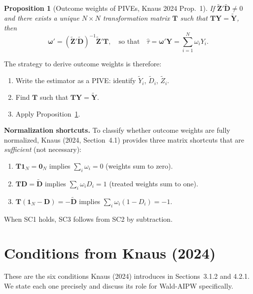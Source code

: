 \documentclass[12pt, a4paper]{article}
\theoremstyle{condstyle}
\theoremstyle{plain}
\newtheorem{proposition}{Proposition}
\newcommand{\bone}{\mathbf{1}_N}
\newcommand{\bzero}{\mathbf{0}_N}
\newcommand{\bD}{\mathbf{D}}
\newcommand{\bY}{\mathbf{Y}}
\begin{document}
\begin{proposition}[Outcome weights of PIVEs, Knaus 2024 Prop.~1]
\label{prop:weights}
If $\tilde{\mathbf{Z}}'\tilde{\mathbf{D}}\neq 0$ and there exists a unique
$N\times N$ transformation matrix $\mathbf{T}$ such that $\mathbf{T}\bY=\tilde{\mathbf{Y}}$,
then
\begin{equation}
  \boldsymbol{\omega}' = (\tilde{\mathbf{Z}}'\tilde{\mathbf{D}})^{-1}\tilde{\mathbf{Z}}'\mathbf{T},
  \quad\text{so that}\quad
  \hat\tau = \boldsymbol{\omega}'\bY = \sum_{i=1}^N \omega_i Y_i.
  \label{eq:prop1}
\end{equation}
\end{proposition}

\noindent
The strategy to derive outcome weights is therefore:
\begin{enumerate}[label=\textbf{Step \arabic*.}]
  \item Write the estimator as a PIVE: identify $\tilde{Y}_i$, $\tilde{D}_i$, $\tilde{Z}_i$.
  \item Find $\mathbf{T}$ such that $\mathbf{T}\bY = \tilde{\mathbf{Y}}$.
  \item Apply Proposition~\ref{prop:weights}.
\end{enumerate}

\medskip\noindent
\textbf{Normalization shortcuts.}
To classify whether outcome weights are fully normalized, Knaus (2024, Section~4.1)
provides three matrix shortcuts that are \emph{sufficient} (not necessary):
\begin{enumerate}[label=\textbf{SC\arabic*.}]
  \item $\mathbf{T}\bone = \bzero$ implies $\sum_i\omega_i = 0$ (weights sum to zero).
  \item $\mathbf{T}\bD = \tilde{\mathbf{D}}$ implies $\sum_i\omega_iD_i = 1$ (treated weights sum to one).
  \item $\mathbf{T}(\bone-\bD)=-\tilde{\mathbf{D}}$ implies $\sum_i\omega_i(1-D_i)=-1$.
\end{enumerate}
When SC1 holds, SC3 follows from SC2 by subtraction.

\section{Conditions from Knaus (2024)}
\label{sec:conditions}

These are the six conditions Knaus (2024) introduces in Sections~3.1.2 and 4.2.1.
We state each one precisely and discuss its role for Wald-AIPW specifically.
\end{document}
